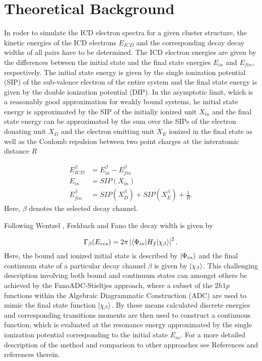\section{Theoretical Background}
\label{sec:theory}

In roder to simulate the ICD electron spectra for a given cluster structure,
the kinetic energies of the ICD electrons $E_{ICD}$ and the corresponding decay
decay widths of all pairs have to be determined. The ICD electron energies
are given by the differences between the initial state and the final state
energies $E_{in}$ and $E_{fin}$, respectively. The initial state energy
is given by the single ionization potential (SIP) of the sub-valence electron
of the entire system
and the final state energy is given by the double ionization potential (DIP).
In the asymptotic limit, which is a reasonably good approximation for
weakly bound systems, he initial state energy is approximated by the SIP
of the initially ionized unit $X_{in}$ and the final state energy can be
approximated
by the sum over the SIPs of the electron donating unit $X_D$ and the electron
emitting unit $X_E$ ionized in the final state as well as the
Coulomb repulsion between two point charges at the interatomic distance $R$

\begin{align}
 E_{ICD}^\beta &= E_{in}^\beta - E_{fin}^\beta \label{equation:E_sec}\\
 E_{in}        &= SIP(X_{in}) \label{equation:E_in}\\          
 E_{fin}^\beta &= SIP(X_{D}^\beta) + SIP(X_{E}^\beta) + \frac 1R
           \label{equation:E_fin}                . 
\end{align}
Here, $\beta$ denotes the selected decay channel.

Following Wentzel \cite{Wentzel27}, Feshbach\cite{Feshbach58,Feshbach62}
and Fano \cite{Fano61} the decay width is given by

\begin{equation}
 \Gamma_{\beta}(E_{res}) = 2\pi \left|
                           \braket{\Phi_{in}| H_f |\chi_{\beta}}
                           \right|^2   .
\end{equation}
Here, the bound and ionized initial state is described by $\ket{\Phi_{in}}$ and
the final continuum state of a particular decay channel $\beta$ is
given by $\ket{\chi_{\beta}}$.
This challenging description involving both bound and continuum states can
amongst others be achieved by the FanoADC-Stieltjes approach, where a
subset of the $2h1p$ functions within the Algebraic Diagrammatic Construction
(ADC) are used to mimic the final state function $\ket{\chi_{\beta}}$.
By these means calculated discrete energies and corresponding transitions
moments are then used to construct a continuous function, which is evaluated
at the resonance energy approximated by the single ionization potential
corresponding to the initial state $E_{in}$. For a more detailed
description of the method and comparison to other approaches see References
\cite{Averbukh05,Fasshauer15_1} and references therein.
